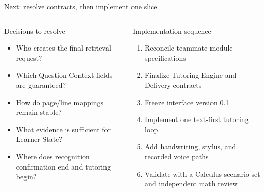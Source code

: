 \documentclass[aspectratio=169,10pt]{beamer}
\begin{document}
\begin{frame}{Next: resolve contracts, then implement one slice}
\begin{columns}[T,onlytextwidth]
\begin{block}{Decisions to resolve}
\begin{itemize}
\item Who creates the final retrieval request?
\item Which Question Context fields are guaranteed?
\item How do page/line mappings remain stable?
\item What evidence is sufficient for Learner State?
\item Where does recognition confirmation end and tutoring begin?
\end{itemize}
\end{block}
\begin{block}{Implementation sequence}
\begin{enumerate}
\item Reconcile teammate module specifications
\item Finalize Tutoring Engine and Delivery contracts
\item Freeze interface version 0.1
\item Implement one text-first tutoring loop
\item Add handwriting, stylus, and recorded voice paths
\item Validate with a Calculus scenario set and independent math review
\end{enumerate}
\end{block}
\end{columns}
\end{frame}
\end{document}
